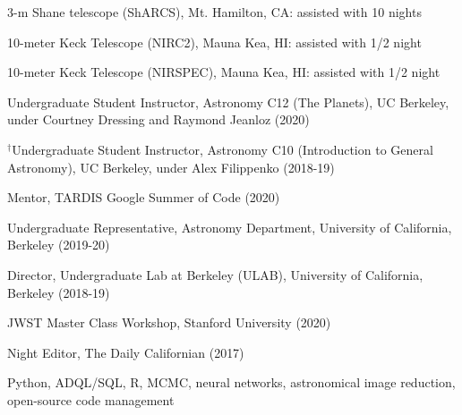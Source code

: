 \documentclass[12pt,letterpaper]{article}
\begin{document}
\begin{list}{}{\cvlist}

\item 3-m Shane telescope (ShARCS), Mt. Hamilton, CA: assisted with 10 nights
\item 10-meter Keck Telescope (NIRC2), Mauna Kea, HI: assisted with 1/2 night
\item 10-meter Keck Telescope (NIRSPEC), Mauna Kea, HI: assisted with 1/2 night

\end{list}


\begin{list}{}{\cvlist}
\item Undergraduate Student Instructor, Astronomy C12 (The Planets), UC Berkeley, under Courtney Dressing and Raymond Jeanloz (2020)
\item $^\dagger$Undergraduate Student Instructor, Astronomy C10 (Introduction to General Astronomy), UC Berkeley, under Alex Filippenko (2018-19)
\end{list}

\begin{list}{}{\cvlist}
\item Mentor, TARDIS Google Summer of Code (2020)
\item Undergraduate Representative, Astronomy Department, University of California, Berkeley (2019-20)
\item Director, Undergraduate Lab at Berkeley (ULAB), University of California, Berkeley (2018-19)
\end{list}

\begin{list}{}{\cvlist}
\item JWST Master Class Workshop, Stanford University (2020)
\item Night Editor, The Daily Californian (2017)
\end{list}

\begin{list}{}{\cvlist}
\item Python, ADQL/SQL, R, MCMC, neural networks, astronomical image reduction, open-source code management
\end{list}
\end{document}
